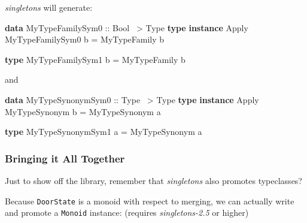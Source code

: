 \documentclass[]{article}
\newenvironment{Shaded}{}{}
\newcommand{\DataTypeTok}[1]{\textcolor[rgb]{0.56,0.13,0.00}{#1}}
\newcommand{\FunctionTok}[1]{\textcolor[rgb]{0.02,0.16,0.49}{#1}}
\newcommand{\KeywordTok}[1]{\textcolor[rgb]{0.00,0.44,0.13}{\textbf{#1}}}
\newcommand{\NormalTok}[1]{#1}
\newcommand{\OtherTok}[1]{\textcolor[rgb]{0.00,0.44,0.13}{#1}}
\begin{document}
\emph{singletons} will generate:

\begin{Shaded}
\begin{Highlighting}[]
\KeywordTok{data} \DataTypeTok{MyTypeFamilySym0}\OtherTok{ ::} \DataTypeTok{Bool} \FunctionTok{~>} \DataTypeTok{Type}
\KeywordTok{type} \KeywordTok{instance} \DataTypeTok{Apply} \DataTypeTok{MyTypeFamilySym0}\NormalTok{ b }\FunctionTok{=} \DataTypeTok{MyTypeFamily}\NormalTok{ b}

\KeywordTok{type} \DataTypeTok{MyTypeFamilySym1}\NormalTok{ b }\FunctionTok{=} \DataTypeTok{MyTypeFamily}\NormalTok{ b}
\end{Highlighting}
\end{Shaded}

and

\begin{Shaded}
\begin{Highlighting}[]
\KeywordTok{data} \DataTypeTok{MyTypeSynonymSym0}\OtherTok{ ::} \DataTypeTok{Type} \FunctionTok{~>} \DataTypeTok{Type}
\KeywordTok{type} \KeywordTok{instance} \DataTypeTok{Apply} \DataTypeTok{MyTypeSynonym}\NormalTok{ b }\FunctionTok{=} \DataTypeTok{MyTypeSynonym}\NormalTok{ a}

\KeywordTok{type} \DataTypeTok{MyTypeSynonymSym1}\NormalTok{ a }\FunctionTok{=} \DataTypeTok{MyTypeSynonym}\NormalTok{ a}
\end{Highlighting}
\end{Shaded}

\hypertarget{bringing-it-all-together}{%
\subsubsection{Bringing it All Together}\label{bringing-it-all-together}}

Just to show off the library, remember that \emph{singletons} also promotes
typeclasses?

Because \texttt{DoorState} is a monoid with respect to merging, we can actually
write and promote a \texttt{Monoid} instance: (requires \emph{singletons-2.5} or
higher)

\begin{Shaded}
\end{Shaded}
\end{document}

